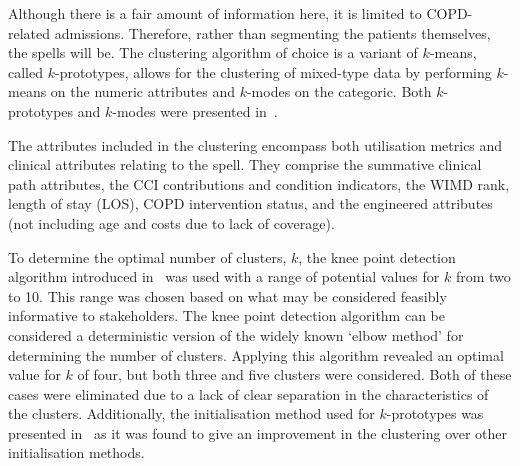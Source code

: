 \documentclass[11pt]{article}
\begin{document}
Although there is a fair amount of information here, it is limited to
COPD-related admissions. Therefore, rather than segmenting the patients
themselves, the spells will be. The clustering algorithm of choice is a variant
of \(k\)-means, called \(k\)-prototypes, allows for the clustering of mixed-type
data by performing \(k\)- means on the numeric attributes and \(k\)-modes on the
categoric. Both \(k\)-prototypes and \(k\)-modes were presented
in~\cite{Huang1998}.

The attributes included in the clustering encompass both utilisation metrics and
clinical attributes relating to the spell. They comprise the summative clinical
path attributes, the CCI contributions and condition indicators, the WIMD rank,
length of stay (LOS), COPD intervention status, and the engineered attributes
(not including age and costs due to lack of coverage).

To determine the optimal number of clusters, \(k\), the knee point detection
algorithm introduced in~\cite{Satopaa2011} was used with a range of potential
values for \(k\) from two to 10. This range was chosen based on what may be
considered feasibly informative to stakeholders. The knee point detection
algorithm can be considered a deterministic version of the widely known `elbow
method' for determining the number of clusters. Applying this algorithm
revealed an optimal value for \(k\) of four, but both three and five clusters
were considered. Both of these cases were eliminated due to a lack of clear
separation in the characteristics of the clusters. Additionally, the
initialisation method used for \(k\)-prototypes was presented
in~\cite{Wilde2020} as it was found to give an improvement in the clustering
over other initialisation methods.
\end{document}
